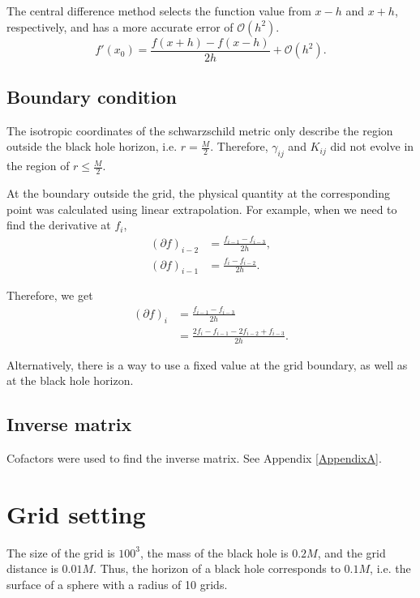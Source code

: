 The central difference method selects the function value from $x-h$ and $x+h$, respectively, and has a more accurate error of $\mathcal{O}(h^2)$.
\begin{equation}
	f'(x_0) = \frac{f(x+ h) - f(x - h)}{2h} + \mathcal{O}(h^2).
\end{equation}

\subsection{Boundary condition}

The isotropic coordinates of the schwarzschild metric only describe the region outside the black hole horizon, i.e. $r=\frac{M}{2}$. Therefore, $\gamma_{ij}$ and $K_{ij}$ did not evolve in the region of $r\le \frac{M}{2}$.

At the boundary outside the grid, the physical quantity at the corresponding point was calculated using linear extrapolation. For example, when we need to find the derivative at $f_i$,
\begin{align}
	(\partial f)_{i - 2} &= \frac{f_{i - 1} - f_{i - 3}}{2h},\\
	(\partial f)_{i - 1} &= \frac{f_{i} - f_{i - 2}}{2h}.
\end{align}

Therefore, we get
\begin{equation}
	\begin{aligned}
			(\partial f)_{i} &= \frac{f_{i - 1} - f_{i - 3}}{2h}\\
			&= \frac{2f_i - f_{i - 1} - 2f_{i - 2} + f_{i - 3}}{2h}.
	\end{aligned}
\end{equation}

Alternatively, there is a way to use a fixed value at the grid boundary, as well as at the black hole horizon.

\subsection{Inverse matrix}

Cofactors were used to find the inverse matrix. See Appendix \ref{AppendixA}.

\section{Grid setting}

The size of the grid is $100^3$, the mass of the black hole is $0.2M$, and the grid distance is $0.01M$. Thus, the horizon of a black hole corresponds to $0.1 M$, i.e. the surface of a sphere with a radius of 10 grids.

